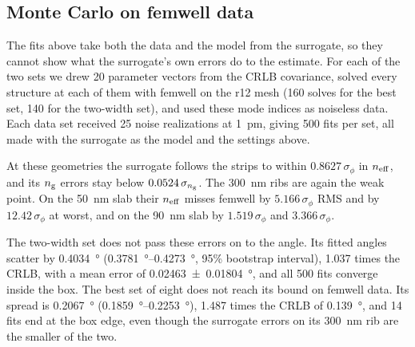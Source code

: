 \subsection{Monte Carlo on femwell data}
\label{sec:surrcheck}

The fits above take both the data and the model from the surrogate, so they cannot show what the surrogate's own
errors do to the estimate. For each of the two sets we drew 20 parameter vectors from the CRLB covariance, solved
every structure at each of them with femwell on the r12 mesh (160 solves for the best set, 140 for the two-width set),
and used these mode indices as noiseless data. Each data set received 25 noise realizations at
\qty{1}{pm}, giving 500 fits per set, all made with the surrogate as the model and the settings above.

At these geometries the surrogate follows the strips to within $0.8627\,\sigma_\phi$ in $n_\mathrm{eff}$, and its $n_\mathrm{g}$ errors
stay below $0.0524\,\sigma_{n_\mathrm{g}}$. The \qty{300}{nm} ribs are again the weak point. On the \qty{50}{nm} slab their
$n_\mathrm{eff}$ misses femwell by $5.166\,\sigma_\phi$ RMS and by $12.42\,\sigma_\phi$ at worst, and on the \qty{90}{nm} slab
by $1.519\,\sigma_\phi$ and $3.366\,\sigma_\phi$.

The two-width set does not pass these errors on to the angle. Its fitted angles scatter by \qty{0.4034}{\degree}
(\qtyrange{0.3781}{0.4273}{\degree}, 95\% bootstrap interval), 1.037 times the CRLB, with a mean error of
\qty{0.02463 \pm 0.01804}{\degree}, and all 500 fits converge inside the box. The best set of eight does not reach its
bound on femwell data. Its spread is \qty{0.2067}{\degree} (\qtyrange{0.1859}{0.2253}{\degree}), 1.487 times the
CRLB of \qty{0.139}{\degree}, and 14 fits end at the box edge, even though the surrogate errors on its
\qty{300}{nm} rib are the smaller of the two.

